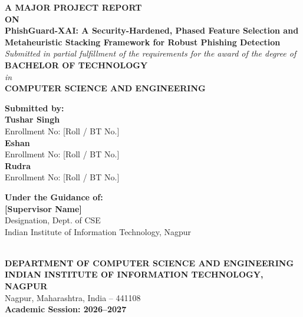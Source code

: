 \documentclass[12pt,a4paper,oneside]{report}
\begin{document}

\begin{titlepage}
    \centering
    \vspace*{0.5cm}
    {\Large \textbf{A MAJOR PROJECT REPORT}}\\[0.3cm]
    {\large \textbf{ON}}\\[0.6cm]
    {\LARGE \textbf{PhishGuard-XAI: A Security-Hardened, Phased Feature Selection and Metaheuristic Stacking Framework for Robust Phishing Detection}}\\[1.5cm]
    
    {\large \textit{Submitted in partial fulfillment of the requirements for the award of the degree of}}\\[0.4cm]
    {\Large \textbf{BACHELOR OF TECHNOLOGY}}\\[0.2cm]
    {\large \textit{in}}\\[0.2cm]
    {\Large \textbf{COMPUTER SCIENCE AND ENGINEERING}}\\[1.5cm]
    
    \begin{minipage}{0.48\textwidth}
        \begin{flushleft} \large
            \textbf{Submitted by:}\\[0.2cm]
            \textbf{Tushar Singh}\\
            Enrollment No: [Roll / BT No.]\\[0.25cm]
            \textbf{Eshan}\\
            Enrollment No: [Roll / BT No.]\\[0.25cm]
            \textbf{Rudra}\\
            Enrollment No: [Roll / BT No.]
        \end{flushleft}
    \end{minipage}
    \hfill
    \begin{minipage}{0.48\textwidth}
        \begin{flushright} \large
            \textbf{Under the Guidance of:}\\[0.2cm]
            \textbf{[Supervisor Name]}\\
            Designation, Dept. of CSE\\
            Indian Institute of Information Technology, Nagpur
        \end{flushright}
    \end{minipage}\\[1.5cm]

    {\large \textbf{DEPARTMENT OF COMPUTER SCIENCE AND ENGINEERING}}\\[0.2cm]
    {\Large \textbf{INDIAN INSTITUTE OF INFORMATION TECHNOLOGY, NAGPUR}}\\[0.2cm]
    {\large Nagpur, Maharashtra, India -- 441108}\\[0.4cm]
    {\large \textbf{Academic Session: 2026--2027}}
\end{titlepage}
\end{document}
